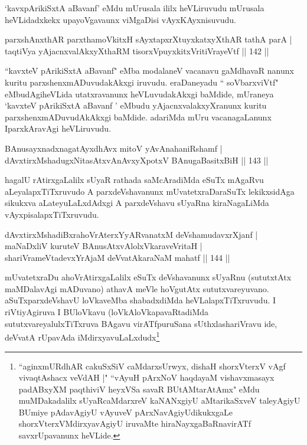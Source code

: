 \begin{artha}
`kavxpArikiSxtA aBavanf' eMdu mUrusala ililx heVLiruvudu mUrusala heVLidadxkekx upayoVgavaunx viMgaDisi vAyxKAyxnisuvudu.
\end{artha}

\begin{shl}
parxshAnxthAR parxthamoVkitxH sAyxtapxrXtuyxkatxyXthAR tathA parA |\\
taqtiVya yAjacnxvalAkxyXthaRM tisorxV\s puyxkitxVritiVrayeVtf \hfill || 142 ||
\end{shl}

\begin{artha}
``kavxteV pArikiSxtA aBavanf" eMba modalaneV vacanavu gaMdhavaR nanunx kuritu parxshenxmADuvudakAkxgi iruvudu. eraDaneyadu `` soV\s barxviVtf" eMbudAgiheVLida utatxravanunx heVLuvudakAkxgi baMdide, mUraneya `kavxteV pArikiSxtA aBavanf ' eMbudu yAjacnxvalakxyXranunx kuritu parxshenxmADuvudAkAkxgi baMdide. adariMda mUru vacanagaLanunx IparxkAravAgi heVLiruvudu.
\end{artha}


\begin{shl}
BAnusayxnadxnagatAyx\s dhAvx mitoV yAvAnahaniRshamf |\\
dAvxtirxMshadugxNitasAtxvAnAvxyXpotxV BAnugaBasitxBiH \hfill || 143 ||
\end{shl}

\begin{artha}
hagalU rAtirxgaLalilx sUyaR rathada saMcAradiMda eSuTx mAgaRvu aLeyalapxTiTxruvudo A parxdeVshavanunx mUvatetxraDaraSuTx lekikxsidAga sikukxva aLateyuLaLxdAdxgi A parxdeVshavu sUyaRna kiraNagaLiMda vAyxpisalapxTiTxruvudu.
\end{artha}


\begin{shl}
dAvxtirxMshadiBxrahoVrAterxYyARvanatxM deVshamudavxrXjanf |\\
maNaDxliV kuruteV BAnusAtxvAlolxVkaraveVritaH |\\
shariVrameVtadevxYrAjaM deVvatAkaraNaM mahatf \hfill || 144 ||
\end{shl}

\begin{artha}
mUvatetxraDu ahoVrAtirxgaLalilx eSuTx deVshavanunx sUyaRnu (sututxtAtx maMDalavAgi mADuvano) athavA meVle hoVgutAtx sututxvareyuvano. aSuTxparxdeVshavU loVkaveMba shabadxdiMda heVLalapxTiTxruvudu. I riVtiyAgiruva I BUloVkavu (loVkAloVkapavaRtadiMda sututxvareyalulxTiTxruva BAgavu virATfpuruSana sUthxlashariVravu ide, deVvatA rUpavAda iMdirxyavuLaLxdudx\footnote{``aginxmURdhAR cakuSxSiV caMdarxsUrwyx, dishaH shorxVterxV vAgf vivaqtAshacx veVdAH |" ``vAyuH pArxNoV haqdayaM vishavxmasayx padABxyXM paqthiviV heyxVSa savaR BUtAMtarAtAmx" eMdu muMDakadalilx sUyaRcaMdarxreV kaNANxgiyU aMtarikaSxveV taleyAgiyU BUmiye pAdavAgiyU vAyuveV pArxNavAgiyUdikukxgaLe shorxVterxVMdirxyavAgiyU iruvaMte hiraNayxgaBaRnavirATf savxrUpavanunx heVLide.}
\end{artha}

